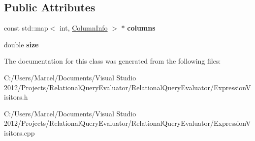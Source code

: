 \subsection*{Public Attributes}
\begin{DoxyCompactItemize}
\item 
\hypertarget{class_size_estimating_expression_visitor_ac3830138167760ff403ad52bd606a560}{const std\+::map$<$ int, \hyperlink{class_column_info}{Column\+Info} $>$ $\ast$ {\bfseries columns}}\label{class_size_estimating_expression_visitor_ac3830138167760ff403ad52bd606a560}

\item 
\hypertarget{class_size_estimating_expression_visitor_a882681f529d9c9cb182ad76a1734921e}{double {\bfseries size}}\label{class_size_estimating_expression_visitor_a882681f529d9c9cb182ad76a1734921e}

\end{DoxyCompactItemize}


The documentation for this class was generated from the following files\+:\begin{DoxyCompactItemize}
\item 
C\+:/\+Users/\+Marcel/\+Documents/\+Visual Studio 2012/\+Projects/\+Relational\+Query\+Evaluator/\+Relational\+Query\+Evaluator/Expression\+Visitors.\+h\item 
C\+:/\+Users/\+Marcel/\+Documents/\+Visual Studio 2012/\+Projects/\+Relational\+Query\+Evaluator/\+Relational\+Query\+Evaluator/Expression\+Visitors.\+cpp\end{DoxyCompactItemize}
